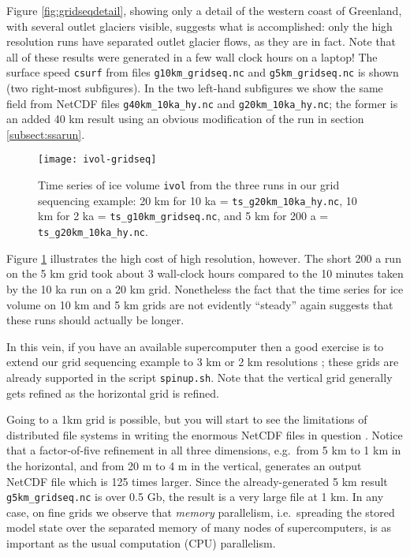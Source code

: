 Figure \ref{fig:gridseqdetail}, showing only a detail of the western coast of Greenland, with several outlet glaciers visible, suggests what is accomplished: only the high resolution runs have separated outlet glacier flows, as they are in fact.  Note that all of these results were generated in a few wall clock hours on a laptop!  The surface speed \texttt{csurf} from files \texttt{g10km_gridseq.nc} and \texttt{g5km_gridseq.nc} is shown (two right-most subfigures).  In the two left-hand subfigures we show the same field from NetCDF files \texttt{g40km_10ka_hy.nc} and \texttt{g20km_10ka_hy.nc}; the former is an added 40 km result using an obvious modification of the run in section \ref{subsect:ssarun}.

\begin{figure}[ht]
\centering
\texttt{[image: ivol-gridseq]}
\caption{Time series of ice volume \texttt{ivol} from the three runs in our grid sequencing example: 20 km for 10 ka = \texttt{ts_g20km_10ka_hy.nc}, 10 km for 2 ka = \texttt{ts_g10km_gridseq.nc}, and 5 km for 200 a = \texttt{ts_g20km_10ka_hy.nc}.}
\label{fig:ivolgridseq}
\end{figure}

Figure \ref{fig:ivolgridseq} illustrates the high cost of high resolution, however.  The short 200 a run on the 5 km grid took about 3 wall-clock hours compared to the 10 minutes taken by the 10 ka run on a 20 km grid.  Nonetheless the fact that the time series for ice volume on 10 km and 5 km grids are not evidently ``steady'' again suggests that these runs should actually be longer.

In this vein, if you have an available supercomputer then a good exercise is to extend our grid sequencing example to 3 km or 2 km resolutions \cite{AschwandenAdalgeirsdottirKhroulev}; these grids are already supported in the script \texttt{spinup.sh}.  Note that the vertical grid generally gets refined as the horizontal grid is refined.

Going to a 1km grid is possible, but you will start to see the limitations of distributed file systems in writing the enormous NetCDF files in question \cite{DickensMorey2013}.  Notice that a factor-of-five refinement in all three dimensions, e.g.~from 5 km to 1 km in the horizontal, and from 20 m to 4 m in the vertical, generates an output NetCDF file which is 125 times larger.  Since the already-generated 5 km result \texttt{g5km_gridseq.nc} is over 0.5 Gb, the result is a very large file at 1 km.  In any case, on fine grids we observe that \emph{memory} parallelism, i.e.~spreading the stored model state over the separated memory of many nodes of supercomputers, is as important as the usual computation (CPU) parallelism.

